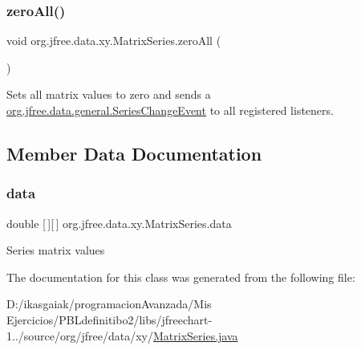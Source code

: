 \subsubsection{\texorpdfstring{zero\+All()}{zeroAll()}}
{\footnotesize\ttfamily void org.\+jfree.\+data.\+xy.\+Matrix\+Series.\+zero\+All (\begin{DoxyParamCaption}{ }\end{DoxyParamCaption})}

Sets all matrix values to zero and sends a \mbox{\hyperlink{classorg_1_1jfree_1_1data_1_1general_1_1_series_change_event}{org.\+jfree.\+data.\+general.\+Series\+Change\+Event}} to all registered listeners. 

\subsection{Member Data Documentation}
\mbox{\label{classorg_1_1jfree_1_1data_1_1xy_1_1_matrix_series_a08a6cb94c4bd17679afea5ee9e2c87a7}} 
\subsubsection{\texorpdfstring{data}{data}}
{\footnotesize\ttfamily double \mbox{[}$\,$\mbox{]}\mbox{[}$\,$\mbox{]} org.\+jfree.\+data.\+xy.\+Matrix\+Series.\+data\hspace{0.3cm}{\ttfamily [protected]}}

Series matrix values 

The documentation for this class was generated from the following file\+:\begin{DoxyCompactItemize}
\item 
D\+:/ikasgaiak/programacion\+Avanzada/\+Mis Ejercicios/\+P\+B\+Ldefinitibo2/libs/jfreechart-\/1../source/org/jfree/data/xy/\mbox{\hyperlink{_matrix_series_8java}{Matrix\+Series.\+java}}\end{DoxyCompactItemize}
